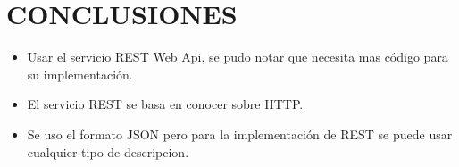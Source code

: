 \section{CONCLUSIONES}

\begin{itemize}
	\item Usar el servicio REST Web Api, se pudo notar que necesita mas código para su implementación.
	\item El servicio REST se basa en conocer sobre HTTP.
	\item Se uso el formato JSON pero para la implementación de REST se puede usar cualquier tipo de descripcion.
\end{itemize}